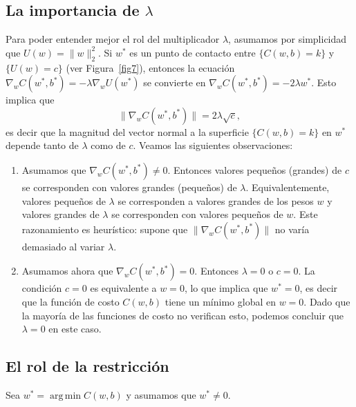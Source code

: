 \documentclass[12pt, a4paper]{amsbook}
\def\argmin{\operatorname {\mathrm{arg\, min}}}
\theoremstyle{remark}
\theoremstyle{definition}
\numberwithin{section}{chapter}
\numberwithin{subsection}{section}
\numberwithin{equation}{section}
\numberwithin{figure}{chapter}
\begin{document}
\subsection*{La importancia de $\lambda$} Para poder entender mejor el rol del multiplicador $\lambda$, asumamos por simplicidad que $U(w)=\|w\|_2^2$. Si $w^*$ es un punto de contacto entre $\{C(w, b)=k\}$ y $\{U(w)=c\}$ (ver Figura~\ref{fig7}), entonces la ecuación $\nabla_w C(w^*, b^*) = -\lambda \nabla_w U(w^*)$ se convierte en $\nabla_w C(w^*, b^*) = -2\lambda w^*$. Esto implica que
$$
\|\nabla_w C(w^*, b^*)\| = 2\lambda\sqrt{c},
$$
 es decir que la magnitud del vector normal a la superficie $\{C(w, b)=k\}$ en $w^*$ depende tanto de $\lambda$ como de $c$. Veamos las siguientes observaciones:
 \begin{enumerate}
 \item Asumamos que $\nabla_w C(w^*, b^*) \neq 0$. Entonces valores pequeños (grandes) de $c$ se corresponden con valores grandes (pequeños) de $\lambda$. Equivalentemente, valores pequeños de $\lambda$ se corresponden a valores grandes de los pesos $w$ y valores grandes de $\lambda$ se corresponden con valores pequeños de $w$. Este razonamiento es heurístico: supone que $\|\nabla_wC(w^*,b^*)\|$ no varía demasiado al variar $\lambda$.
 
 \item Asumamos ahora que $\nabla_w C(w^*, b^*)=0$. Entonces $\lambda=0$ o $c=0$. La condición $c=0$ es equivalente a $w=0$, lo que implica que $w^*=0$, es decir que la función de costo $C(w, b)$ tiene un mínimo global en $w=0$. Dado que la mayoría de las funciones de costo no verifican esto, podemos concluir que $\lambda=0$ en este caso.
 \end{enumerate}

\subsection*{El rol de la restricción} Sea $w^* = \argmin C(w, b)$ y asumamos que $w^*\neq 0$. 
\end{document}
